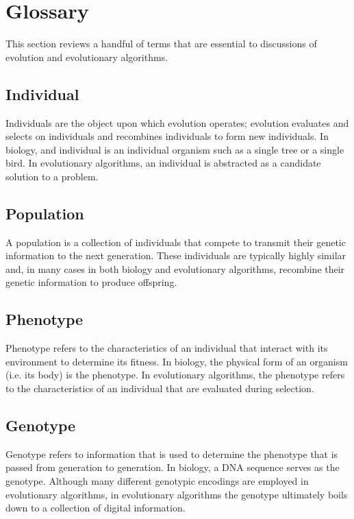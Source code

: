 \section{Glossary} \label{sec:glossary}

This section reviews a handful of terms that are essential to discussions of evolution and evolutionary algorithms.

\subsection{Individual}

Individuals are the object upon which evolution operates; evolution evaluates and selects on individuals and recombines individuals to form new individuals. In biology, and individual is an individual organism such as a single tree or a single bird. In evolutionary algorithms, an individual is abstracted as a candidate solution to a problem.

\subsection{Population}

A population is a collection of individuals that compete to transmit their genetic information to the next generation. These individuals are typically highly similar and, in many cases in both biology and evolutionary algorithms, recombine their genetic information to produce offspring.

\subsection{Phenotype}

Phenotype refers to the characteristics of an individual that interact with its environment to determine its fitness. In biology, the physical form of an organism (i.e. its body) is the phenotype. In evolutionary algorithms, the phenotype refers to the characteristics of an individual that are evaluated during selection.

\subsection{Genotype}

Genotype refers to information that is used to determine the phenotype that is passed from generation to generation. In biology, a DNA sequence serves as the genotype. Although many different genotypic encodings are employed in evolutionary algorithms, in evolutionary algorithms the genotype ultimately boils down to a collection of digital information.

